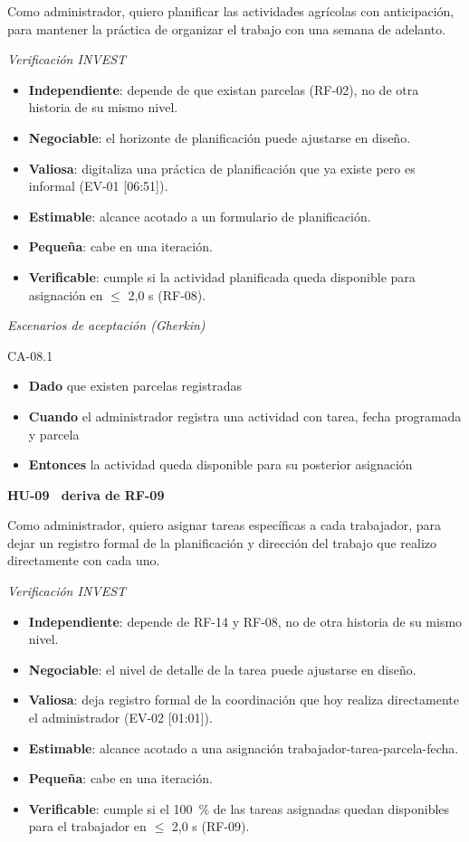\documentclass[12pt,a4paper]{article}
\begin{document}
\smallskip
\noindent Como administrador, quiero planificar las actividades agrícolas con anticipación, para mantener la práctica de organizar el trabajo con una semana de adelanto.

\smallskip
\noindent\textit{Verificación INVEST}
\begin{itemize}
\item \textbf{Independiente}: depende de que existan parcelas (RF-02), no de otra historia de su mismo nivel.
\item \textbf{Negociable}: el horizonte de planificación puede ajustarse en diseño.
\item \textbf{Valiosa}: digitaliza una práctica de planificación que ya existe pero es informal (EV-01 [06:51]).
\item \textbf{Estimable}: alcance acotado a un formulario de planificación.
\item \textbf{Pequeña}: cabe en una iteración.
\item \textbf{Verificable}: cumple si la actividad planificada queda disponible para asignación en $\leq$ 2,0 s (RF-08).
\end{itemize}

\smallskip
\noindent\textit{Escenarios de aceptación (Gherkin)}

\noindent CA-08.1
\begin{itemize}
\item[] \textbf{Dado} que existen parcelas registradas
\item[] \textbf{Cuando} el administrador registra una actividad con tarea, fecha programada y parcela
\item[] \textbf{Entonces} la actividad queda disponible para su posterior asignación
\end{itemize}

\bigskip
\noindent\textbf{HU-09 \textperiodcentered\ deriva de RF-09}

\smallskip
\noindent Como administrador, quiero asignar tareas específicas a cada trabajador, para dejar un registro formal de la planificación y dirección del trabajo que realizo directamente con cada uno.

\smallskip
\noindent\textit{Verificación INVEST}
\begin{itemize}
\item \textbf{Independiente}: depende de RF-14 y RF-08, no de otra historia de su mismo nivel.
\item \textbf{Negociable}: el nivel de detalle de la tarea puede ajustarse en diseño.
\item \textbf{Valiosa}: deja registro formal de la coordinación que hoy realiza directamente el administrador (EV-02 [01:01]).
\item \textbf{Estimable}: alcance acotado a una asignación trabajador-tarea-parcela-fecha.
\item \textbf{Pequeña}: cabe en una iteración.
\item \textbf{Verificable}: cumple si el 100~\% de las tareas asignadas quedan disponibles para el trabajador en $\leq$ 2,0 s (RF-09).
\end{itemize}
\end{document}
